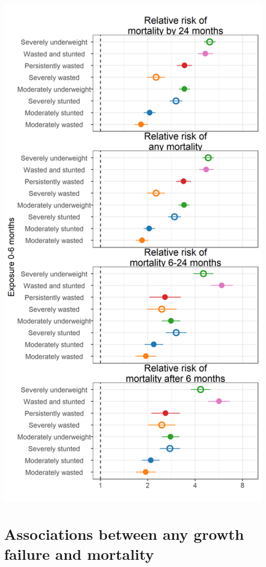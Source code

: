 \documentclass[9pt,]{book}
\begin{document}
\includegraphics[width=21.67in]{figure-copies/fig-mort-RR-time-death_FE}

\section{Associations between any growth failure and
mortality}\label{associations-between-any-growth-failure-and-mortality}
\end{document}
